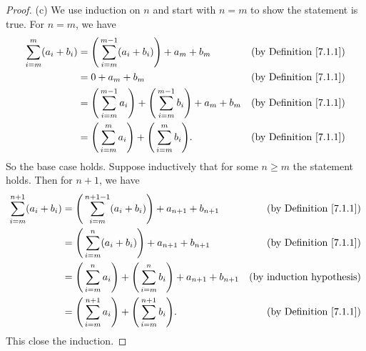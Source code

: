 \begin{proof}{(c)}
We use induction on \(n\) and start with \(n = m\) to show the statement is true.
For \(n = m\), we have
\begin{align*}
\sum_{i = m}^m (a_i + b_i) &= \Bigg(\sum_{i = m}^{m - 1} (a_i + b_i)\Bigg) + a_m + b_m & \text{(by Definition \ref{7.1.1})} \\
&= 0 + a_m + b_m & \text{(by Definition \ref{7.1.1})} \\
&= \Bigg(\sum_{i = m}^{m - 1} a_i\Bigg) + \Bigg(\sum_{i = m}^{m - 1} b_i\Bigg) + a_m + b_m & \text{(by Definition \ref{7.1.1})} \\
&= \Bigg(\sum_{i = m}^m a_i\Bigg) + \Bigg(\sum_{i = m}^m b_i\Bigg). & \text{(by Definition \ref{7.1.1})}
\end{align*}
So the base case holds.
Suppose inductively that for some \(n \geq m\) the statement holds.
Then for \(n + 1\), we have
\begin{align*}
\sum_{i = m}^{n + 1} (a_i + b_i) &= \Bigg(\sum_{i = m}^{n + 1 - 1} (a_i + b_i)\Bigg) + a_{n + 1} + b_{n + 1} & \text{(by Definition \ref{7.1.1})} \\
&= \Bigg(\sum_{i = m}^n (a_i + b_i)\Bigg) + a_{n + 1} + b_{n + 1} & \text{(by Definition \ref{7.1.1})} \\
&= \Bigg(\sum_{i = m}^n a_i\Bigg) + \Bigg(\sum_{i = m}^n b_i\Bigg) + a_{n + 1} + b_{n + 1} & \text{(by induction hypothesis)} \\
&= \Bigg(\sum_{i = m}^{n + 1} a_i\Bigg) + \Bigg(\sum_{i = m}^{n + 1} b_i\Bigg). & \text{(by Definition \ref{7.1.1})}
\end{align*}
This close the induction.
\end{proof}

